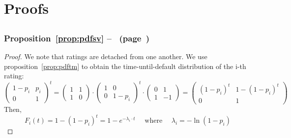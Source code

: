 \documentclass[11pt,fleqn]{book} %
\begin{document}
\chapter{Proofs}

\section{}

\subsection{Proposition~\ref{prop:pdfsv} --~ (page~\pageref{prop:pdfsv})}
\begin{proof}
	We note that ratings are detached from one another. We use 
	proposition~\ref{prop:pdftm} to obtain the time-until-default distribution 
	of the i-th rating:
	\small
	\begin{displaymath}
		\left(
		\begin{array}{cc}
			1-p_i & p_i \\
			0 & 1
		\end{array}
		\right) ^ t 
		= 
		\left(
		\begin{array}{cc}
			1 & 1 \\
			1 & 0
		\end{array}
		\right) 
		\cdot
		\left(
		\begin{array}{cc}
			1 & 0 \\
			0 & 1-p_i
		\end{array}
		\right) ^t 
		\cdot
		\left(
		\begin{array}{cc}
			0 & 1 \\
			1 & -1
		\end{array}
		\right)
		=
		\left(
		\begin{array}{cc}
			(1-p_i)^t & 1-(1-p_i)^t \\
			0 & 1
		\end{array}
		\right)
	\end{displaymath}
	Then,
	\begin{displaymath}
		F_i(t) = 1-(1-p_i)^t = 1 - e^{-\lambda_i \cdot t} \quad \text{ where } \quad \lambda_i = -\ln(1-p_i)
	\end{displaymath}
\end{proof}
\end{document}
